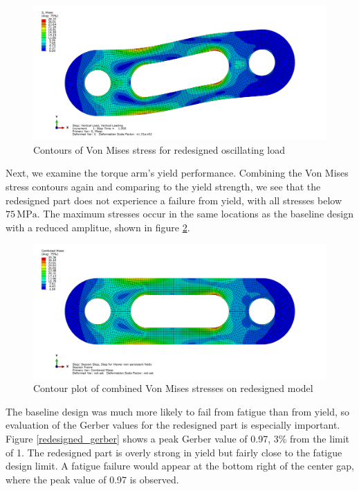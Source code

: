 \documentclass[../main.tex]{subfiles}
\begin{document}
\begin{figure}[H]
    \centering
    \includegraphics[scale=0.2]{../../images/40bush_30body_vertical_mises.png}
    \caption{Contours of Von Mises stress for redesigned oscillating load}
    \label{redesigned_vertical_mises}
\end{figure}

Next, we examine the torque arm's yield performance. 
Combining the Von Mises stress contours again and comparing to the yield strength, we see that the redesigned part does not experience a failure from yield, with all stresses below \(75\,\unit{\mega\pascal}\).
The maximum stresses occur in the same locations as the baseline design with a reduced amplitue, shown in figure \ref{redesigned_combined_mises}.


\begin{figure}[H]
    \centering
    \includegraphics[scale=0.2]{../../images/40bush_30body_combined_mises.png}
    \caption{Contour plot of combined Von Mises stresses on redesigned model}
    \label{redesigned_combined_mises}
\end{figure}

The baseline design was much more likely to fail from fatigue than from yield, so evaluation of the Gerber values for the redesigned part is especially important.
Figure \ref{redesigned_gerber} shows a peak Gerber value of 0.97, 3\% from the limit of 1.
The redesigned part is overly strong in yield but fairly close to the fatigue design limit.
A fatigue failure would appear at the bottom right of the center gap, where the peak value of 0.97 is observed.
\end{document}
